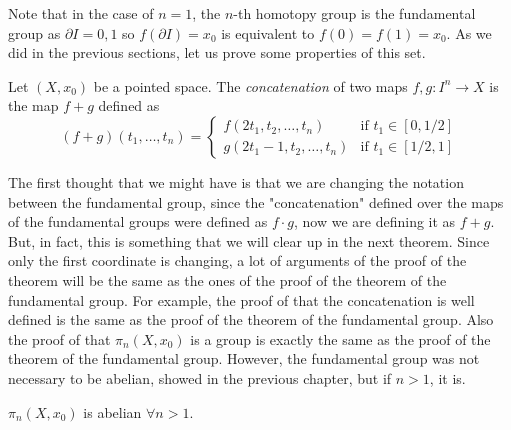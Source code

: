 \documentclass[12pt]{article}
\begin{document}
Note that in the case of \(n=1\), the \(n\)-th homotopy group is the fundamental group as \(\partial I = {0,1}\) so \(f(\partial I) = x_0\) is equivalent to \(f(0) = f(1) = x_0\). As we did in the previous sections, let us prove some properties of this set.

\begin{definition}
	Let \((X, x_0)\) be a pointed space. The \textit{concatenation} of two maps \(f, g : I^n \rightarrow X\) is the map \(f + g\) defined as
	\begin{equation*}
		(f + g)(t_1, \dots, t_n) = \begin{cases}
			f(2t_1, t_2, \dots, t_n) & \text{if } t_1 \in [0, 1/2] \\
			g(2t_1-1, t_2, \dots, t_n) & \text{if } t_1 \in [1/2, 1]
		\end{cases}
	\end{equation*}
\end{definition}

The first thought that we might have is that we are changing the notation between the fundamental group, since the "concatenation" defined over the maps of the fundamental groups were defined as \(f \cdot g\), now we are defining it as \(f + g\). But, in fact, this is something that we will clear up in the next theorem. Since only the first coordinate is changing, a lot of arguments of the proof of the theorem will be the same as the ones of the proof of the theorem of the fundamental group. For example, the proof of that the concatenation is well defined is the same as the proof of the theorem of the fundamental group. Also the proof of that \(\pi_n(X, x_0)\) is a group is exactly the same as the proof of the theorem of the fundamental group. However, the fundamental group was not necessary to be abelian, showed in the previous chapter, but if \(n > 1\), it is.

\begin{proposition}
	\(\pi_n(X, x_0)\) is abelian \(\forall n > 1\).
\end{proposition}
\end{document}
